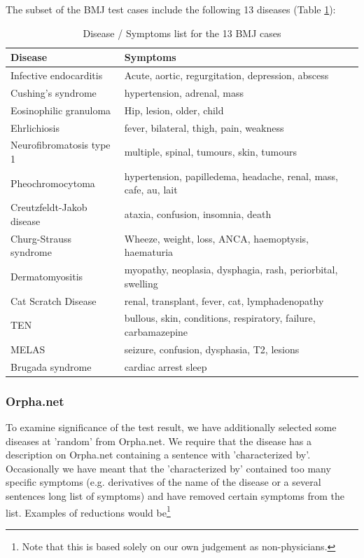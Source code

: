 The subset of the BMJ test cases include the following 13 diseases (Table \ref{BMJCases}):

\begin{table}[H]
  \begin{scriptsize}
    \begin{tabular}{|l|p{7cm}|}
      \hline
      Disease & Symptoms \\
      \hline
      Infective endocarditis & Acute, aortic,  regurgitation, depression,  abscess \\
      \hline
      Cushing's syndrome & hypertension, adrenal, mass \\
      \hline
    Eosinophilic granuloma & Hip, lesion, older, child \\
    \hline
    Ehrlichiosis & fever, bilateral, thigh, pain, weakness \\
    \hline
    Neurofibromatosis type 1 & multiple, spinal, tumours, skin, tumours \\
    \hline
    Pheochromocytoma & hypertension, papilledema, headache, renal, mass, cafe, au, lait \\
    \hline
    Creutzfeldt-Jakob disease & ataxia, confusion, insomnia, death \\
    \hline
    Churg-Strauss syndrome & Wheeze, weight, loss, ANCA, haemoptysis, haematuria \\
    \hline
    Dermatomyositis & myopathy, neoplasia, dysphagia, rash, periorbital, swelling \\
    \hline
    Cat Scratch Disease & renal, transplant, fever, cat, lymphadenopathy \\
    \hline
    TEN & bullous, skin, conditions, respiratory, failure, carbamazepine \\
    \hline
    MELAS & seizure, confusion, dysphasia, T2, lesions \\
    \hline
    Brugada syndrome & cardiac arrest sleep \\
    \hline
  \end{tabular}
  \end{scriptsize}
  \caption{Disease / Symptoms list for the 13 BMJ cases}
  \label{BMJCases}
\end{table}

\subsubsection{Orpha.net}
To examine significance of the test result, we have additionally
selected some diseases at 'random' from Orpha.net. We require that the
disease has a description on Orpha.net containing a sentence with
'characterized by'. Occasionally we have meant that the 'characterized
by' contained too many specific symptoms (e.g. derivatives of the name
of the disease or a several sentences long list of symptoms) and have
removed certain symptoms from the list. Examples of reductions would
be\footnote{Note that this is based solely on our own judgement as
  non-physicians.}

